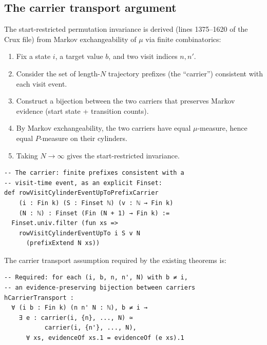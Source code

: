 \documentclass[11pt]{article}
\theoremstyle{definition}
\begin{document}
\subsection{The carrier transport argument}
\label{sec:carrier}

The start-restricted permutation invariance is derived (lines 1375--1620
of the Crux file) from Markov exchangeability of $\mu$ via finite
combinatorics:

\begin{enumerate}[leftmargin=2em]
\item Fix a state $i$, a target value $b$, and two visit indices $n, n'$.
\item Consider the set of length-$N$ trajectory prefixes
  (the ``carrier'') consistent with each visit event.
\item Construct a bijection between the two carriers that preserves
  Markov evidence (start state + transition counts).
\item By Markov exchangeability, the two carriers have equal
  $\mu$-measure, hence equal $P$-measure on their cylinders.
\item Taking $N \to \infty$ gives the start-restricted invariance.
\end{enumerate}

\begin{lstlisting}
-- The carrier: finite prefixes consistent with a
-- visit-time event, as an explicit Finset:
def rowVisitCylinderEventUpToPrefixCarrier
    (i : Fin k) (S : Finset ℕ) (v : ℕ → Fin k)
    (N : ℕ) : Finset (Fin (N + 1) → Fin k) :=
  Finset.univ.filter (fun xs =>
    rowVisitCylinderEventUpTo i S v N
      (prefixExtend N xs))
\end{lstlisting}

The carrier transport assumption required by the existing theorems is:

\begin{lstlisting}
-- Required: for each (i, b, n, n', N) with b ≠ i,
-- an evidence-preserving bijection between carriers
hCarrierTransport :
  ∀ (i b : Fin k) (n n' N : ℕ), b ≠ i →
    ∃ e : carrier(i, {n}, ..., N) ≃
           carrier(i, {n'}, ..., N),
      ∀ xs, evidenceOf xs.1 = evidenceOf (e xs).1
\end{lstlisting}
\end{document}
